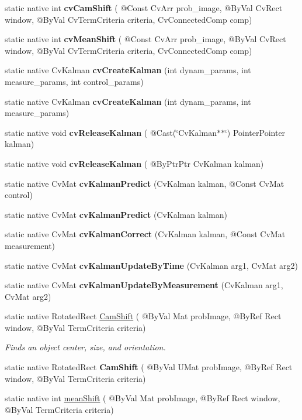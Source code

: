 \begin{DoxyCompactItemize}
\item 
static native int {\bfseries cv\+Cam\+Shift} ( @Const Cv\+Arr prob\+\_\+image, @By\+Val Cv\+Rect window, @By\+Val Cv\+Term\+Criteria criteria, Cv\+Connected\+Comp comp)
\item 
static native int {\bfseries cv\+Mean\+Shift} ( @Const Cv\+Arr prob\+\_\+image, @By\+Val Cv\+Rect window, @By\+Val Cv\+Term\+Criteria criteria, Cv\+Connected\+Comp comp)
\item 
static native Cv\+Kalman {\bfseries cv\+Create\+Kalman} (int dynam\+\_\+params, int measure\+\_\+params, int control\+\_\+params)
\item 
static native Cv\+Kalman {\bfseries cv\+Create\+Kalman} (int dynam\+\_\+params, int measure\+\_\+params)
\item 
static native void {\bfseries cv\+Release\+Kalman} ( @Cast(\char`\"{}Cv\+Kalman$\ast$$\ast$\char`\"{}) Pointer\+Pointer kalman)
\item 
static native void {\bfseries cv\+Release\+Kalman} ( @By\+Ptr\+Ptr Cv\+Kalman kalman)
\item 
static native Cv\+Mat {\bfseries cv\+Kalman\+Predict} (Cv\+Kalman kalman, @Const Cv\+Mat control)
\item 
static native Cv\+Mat {\bfseries cv\+Kalman\+Predict} (Cv\+Kalman kalman)
\item 
static native Cv\+Mat {\bfseries cv\+Kalman\+Correct} (Cv\+Kalman kalman, @Const Cv\+Mat measurement)
\item 
static native Cv\+Mat {\bfseries cv\+Kalman\+Update\+By\+Time} (Cv\+Kalman arg1, Cv\+Mat arg2)
\item 
static native Cv\+Mat {\bfseries cv\+Kalman\+Update\+By\+Measurement} (Cv\+Kalman arg1, Cv\+Mat arg2)
\item 
static native Rotated\+Rect \hyperlink{group__video__track_ga813283f225d7c4ce103da8b37981c69e}{Cam\+Shift} ( @By\+Val Mat prob\+Image, @By\+Ref Rect window, @By\+Val Term\+Criteria criteria)
\begin{DoxyCompactList}\small\item\em Finds an object center, size, and orientation. \end{DoxyCompactList}\item 
static native Rotated\+Rect {\bfseries Cam\+Shift} ( @By\+Val U\+Mat prob\+Image, @By\+Ref Rect window, @By\+Val Term\+Criteria criteria)
\item 
static native int \hyperlink{group__video__track_gad3336224aac304be4ee36ef146ec40d8}{mean\+Shift} ( @By\+Val Mat prob\+Image, @By\+Ref Rect window, @By\+Val Term\+Criteria criteria)
$$
\end{DoxyCompactItemize}
